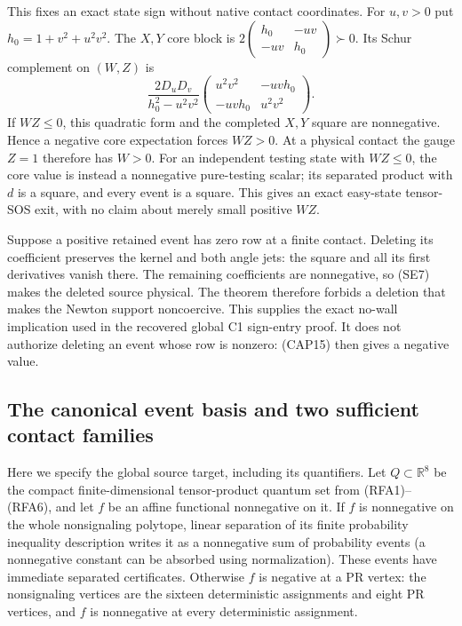 This fixes an exact state sign without native contact coordinates.
For $u,v>0$ put $h_0=1+v^2+u^2v^2$.  The $X,Y$ core block is
$2\left(\begin{smallmatrix}h_0&-uv\\-uv&h_0\end{smallmatrix}\right)
\succ0$.  Its Schur complement on $(W,Z)$ is
\[
\frac{2D_uD_v}{h_0^2-u^2v^2}
\begin{pmatrix}u^2v^2&-uvh_0\\-uvh_0&u^2v^2\end{pmatrix}.
\tag{SE9}
\]
If $WZ\leq0$, this quadratic form and the completed $X,Y$ square
are nonnegative.  Hence a negative core expectation forces $WZ>0$.
At a physical contact the gauge $Z=1$ therefore has $W>0$.
For an independent testing state with $WZ\leq0$, the core value is
instead a nonnegative pure-testing scalar; its separated product with
$d$ is a square, and every event is a square.  This gives an exact
easy-state tensor-SOS exit, with no claim about merely small positive
$WZ$.

Suppose a positive retained event has zero row at a finite contact.
Deleting its coefficient preserves the kernel and both angle jets:
the square and all its first derivatives vanish there.  The remaining
coefficients are nonnegative, so (SE7) makes the deleted source physical.
The theorem therefore forbids a deletion that makes the Newton support
noncoercive.  This supplies the exact no-wall implication used in the
recovered global C1 sign-entry proof.  It does not authorize deleting
an event whose row is nonzero: (CAP15) then gives a negative value.

\subsection{The canonical event basis and two sufficient contact families}

Here we specify the global source target, including its quantifiers.
Let $Q\subset\mathbb R^8$ be the compact finite-dimensional
tensor-product quantum set from (RFA1)--(RFA6), and let $f$ be an affine
functional nonnegative on it.  If $f$ is nonnegative on the whole
nonsignaling polytope, linear separation of its finite probability
inequality description writes it as a nonnegative sum of probability
events (a nonnegative constant can be absorbed using normalization).
These events have immediate separated certificates.  Otherwise $f$ is
negative at a PR vertex: the nonsignaling vertices are the sixteen
deterministic assignments and eight PR vertices, and $f$ is nonnegative
at every deterministic assignment.


